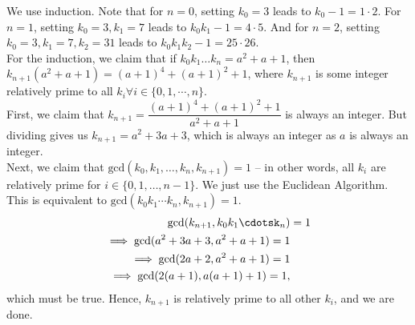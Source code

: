 \documentclass{scrartcl}
\begin{document}
\begin{soln}
	We use induction. Note that for $n=0$, setting $k_0=3$ leads to $k_0-1 = 1 \cdot 2$. For $n=1$, setting $k_0=3, k_1=7$ leads to $k_0k_1-1 = 4 \cdot 5$. And for $n=2$, setting $k_0=3, k_1=7, k_2=31$ leads to $k_0k_1k_2-1 = 25 \cdot 26$. \\
	For the induction, we claim that if $k_0k_1 \dotsc k_n = a^2+a+1$, then $k_{n+1}(a^2+a+1) = (a+1)^4+(a+1)^2+1$, where $k_{n+1}$ is some integer relatively prime to all $k_i \forall i \in \{0,1, \cdots, n\}$. \\
	First, we claim that $k_{n+1} = \dfrac{(a+1)^4 + (a+1)^2 + 1}{a^2+a+1}$ is always an integer. But dividing gives us $k_{n+1} = a^2+3a+3$, which is always an integer as $a$ is always an integer. \\
	Next, we claim that $\text{gcd}(k_0, k_1, \dotsc, k_n, k_{n+1}) = 1$ -- in other words, all $k_i$ are relatively prime for $i \in \{0, 1, \dotsc, n-1\}$. We just use the Euclidean Algorithm. This is equivalent to $\text{gcd}(k_0k_1 \cdots k_n, k_{n+1}) = 1$.
	\begin{align*}
		\text{gcd}(k_{n+1}, k_0k_1\cdotsk_n) &= 1 \\
		\implies \text{gcd}(a^2+3a+3, a^2+a+1) = 1 \\
		\implies \text{gcd}(2a+2, a^2+a+1) = 1 \\
		\implies \text{gcd}(2(a+1), a(a+1)+1) = 1,
	\end{align*}
	which must be true. Hence, $k_{n+1}$ is relatively prime to all other $k_i$, and we are done.
\end{soln}
\end{document}
